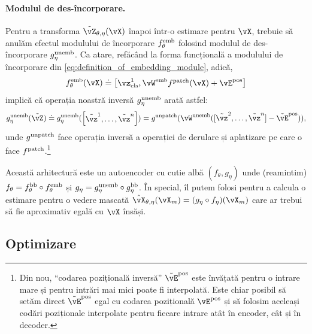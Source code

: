 \documentclass[../../book-main_ro.tex]{subfiles}
\begin{document}
\paragraph{Modulul de des-încorporare.} Pentru a transforma \(\tilde{\vZ}_{\theta, \eta}(\vX)\) înapoi într-o estimare pentru \(\vX\), trebuie să anulăm efectul modulului de încorporare \(f_{\theta}^{\mathrm{emb}}\) folosind modulul de des-încorporare \(g_{\eta}^{\mathrm{unemb}}\). Ca atare, refăcând la forma funcțională a modulului de încorporare din \eqref{eq:definition_of_embedding_module}, adică,
\begin{equation}
    f_{\theta}^{\emb}(\vX) \doteq \mat{\vz_{\cls}^{1}, \vW^{\emb}f^{\patch}(\vX) + \vE^{\pos}}
\end{equation}
implică că operația noastră inversă \(g_{\eta}^{\mathrm{unemb}}\) arată astfel:
\begin{equation}
    g_{\eta}^{\unemb}(\tilde{\vZ}) \doteq g_{\eta}^{\unemb}(\mat{\tilde{\vz}^{1}, \dots, \tilde{\vz}^{n}}) = g^{\unpatch}(\vW^{\unemb}([\tilde{\vz}^{2}, \dots, \tilde{\vz}^{n}] - \tilde{\vE}^{\pos})),
\end{equation}
unde \(g^{\mathrm{unpatch}}\) face operația inversă a operației de derulare și aplatizare pe care o face \(f^{\mathrm{patch}}\).\footnote{Din nou, ``codarea pozițională inversă'' \(\tilde{\vE}^{\pos}\) este învățată pentru o intrare mare și pentru intrări mai mici poate fi interpolată. Este chiar posibil să setăm direct \(\tilde{\vE}^{\pos}\) egal cu codarea pozițională \(\vE^{\pos}\) și să folosim aceleași codări poziționale interpolate pentru fiecare intrare atât în encoder, cât și în decoder.}

Această arhitectură este un autoencoder cu cutie albă \((f_{\theta}, g_{\eta})\) unde (reamintim) \(f_{\theta} = f_{\theta}^{\mathrm{bb}} \circ f_{\theta}^{\mathrm{emb}}\) și \(g_{\eta} = g_{\eta}^{\mathrm{unemb}} \circ g_{\eta}^{\mathrm{bb}}\). În special, îl putem folosi pentru a calcula o estimare pentru o vedere mascată \(\hat{\vX}_{\theta, \eta}(\vX_{m}) = (g_{\eta} \circ f_{\eta})(\vX_{m})\) care ar trebui să fie aproximativ egală cu \(\vX\) însăși.

\subsection{Optimizare}\label{sub:image_completion_optimization}
\end{document}

